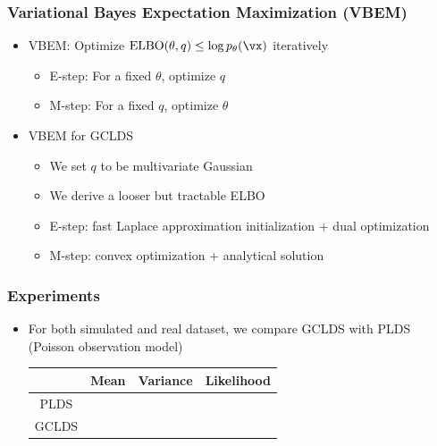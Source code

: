 \documentclass[16pt,presentation]{beamer}
\newcommand{\cmark}{\ding{51}}%
\newcommand{\xmark}{\ding{55}}%
\begin{document}
\begin{frame}
\frametitle{Variational Bayes Expectation Maximization (VBEM)}
\begin{itemize}
\item VBEM: Optimize $\text{ELBO}(\theta, q) \leq \log p_\theta(\vx)$ iteratively %
\begin{itemize}
\item E-step: For a fixed $\theta$, optimize $q$ %
\item M-step: For a fixed $q$, optimize $\theta$
\end{itemize}
\item VBEM for GCLDS 
\begin{itemize}
\item We set $q$ to be multivariate Gaussian
\item We derive a looser but tractable ELBO%
\item E-step: fast Laplace approximation initialization + dual optimization
\item M-step: convex optimization + analytical solution
\end{itemize}
\end{itemize}
\end{frame}


\begin{frame}
\frametitle{Experiments}
\begin{itemize}
\item For both simulated and real dataset, we compare GCLDS with PLDS (Poisson observation model)
\begin{center}
\begin{tabular}{ cccc } 
 \hline
  & Mean & \alert{Variance} & \alert{Likelihood} \\
 \hline
 PLDS & \cmark & \xmark& \xmark \\ 
 \alert{GCLDS} &\cmark &\cmark &\cmark \\ 
 \hline
\end{tabular}
\end{center}
\end{itemize}
\end{frame}
\end{document}
